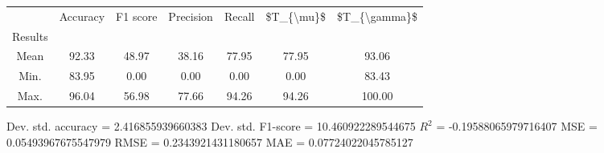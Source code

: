 \begin{tabular}{|c|c|c|c|c|c|c|}
\toprule
{} &  Accuracy &  F1 score &  Precision &  Recall &  \$T\_\{\textbackslash mu\}\$ &  \$T\_\{\textbackslash gamma\}\$ \\
Results &           &           &            &         &            &               \\
\hline
Mean    &     92.33 &     48.97 &      38.16 &   77.95 &      77.95 &         93.06 \\
Min.    &     83.95 &      0.00 &       0.00 &    0.00 &       0.00 &         83.43 \\
Max.    &     96.04 &     56.98 &      77.66 &   94.26 &      94.26 &        100.00 \\
\bottomrule
\end{tabular}

 Dev. std. accuracy = 2.416855939660383
 Dev. std. F1-score = 10.460922289544675
 $R^2$ = -0.19588065979716407
 MSE = 0.05493967675547979
 RMSE = 0.2343921431180657
 MAE = 0.07724022045785127